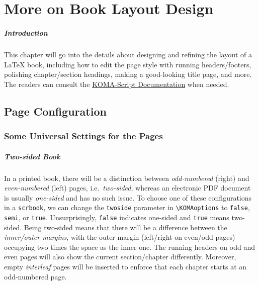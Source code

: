 \chapter{More on Book Layout Design}

\paragraph{Introduction}
This chapter will go into the details about designing and refining the layout of a \LaTeX{} book, including how to edit the page style with running headers/footers, polishing chapter/section headings, making a good-looking title page, and more. The readers can consult the \href{https://mirrors.ctan.org/macros/latex/contrib/koma-script/doc/scrguide-en.pdf}{KOMA-Script 
Documentation} when needed.

\section{Page Configuration}

\subsection{Some Universal Settings for the Pages}

\paragraph{Two-sided Book}
In a printed book, there will be a distinction between \textit{odd-numbered} (right) and \textit{even-numbered} (left) pages, i.e.\ \textit{two-sided}, whereas an electronic PDF document is usually \textit{one-sided} and has no such issue. To choose one of these configurations in a \texttt{scrbook}, we can change the \texttt{twoside} parameter in \texttt{\textbackslash KOMAoptions} to \texttt{false}, \texttt{semi}, or \texttt{true}. Unsurprisingly, \texttt{false} indicates one-sided and \texttt{true} means two-sided. Being two-sided means that there will be a difference between the \textit{inner/outer margins}, with the outer margin (left/right on even/odd pages) occupying two times the space as the inner one. The running headers on odd and even pages will also show the current section/chapter differently. Moreover, empty \textit{interleaf} pages will be inserted to enforce that each chapter starts at an odd-numbered page.

